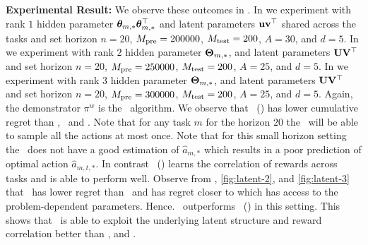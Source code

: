 \textbf{Experimental Result:} We observe these outcomes in . In  we experiment with rank $1$ hidden parameter $\boldsymbol{\theta}_{m,*}\boldsymbol{\theta}_{m,*}^\top$ and latent parameters $\mathbf{u}\mathbf{v}^\top$ shared across the tasks and set horizon $n=20$, $M_{\text{pre}} =  200000$, $M_{\text{test}} = 200$, $A=30$, and $d=5$. 
%
In  we experiment with rank $2$ hidden parameter $\mathbf{\Theta}_{m,*}$, and latent parameters $\mathbf{U}\mathbf{V}^\top$ and set horizon $n=20$, $M_{\text{pre}} =  250000$, $M_{\text{test}} = 200$, $A=25$, and $d=5$. 
%
In  we experiment with rank $3$ hidden parameter $\mathbf{\Theta}_{m,*}$, and latent parameters $\mathbf{U}\mathbf{V}^\top$ and set horizon $n=20$, $M_{\text{pre}} =  300000$, $M_{\text{test}} = 200$, $A=25$, and $d=5$. 
%
Again, the demonstrator $\pi^w$ is the \ts\ algorithm. We observe that \pred\ (\gt) has lower cumulative regret than \dptg, \ad\ and \ts. Note that for any task $m$ for the horizon $20$ the \ts\ will be able to sample all the actions at most once.
%
%
Note that for this small horizon setting the \dptg\ does not have a good estimation of $\widehat{a}_{m,*}$ which results in a poor prediction of optimal action $\widehat{a}_{m,t,*}$. In contrast \pred\ (\gt) learns the correlation of rewards across tasks and is able to perform well.
Observe from , \ref{fig:latent-2}, and \ref{fig:latent-3} that \pred\ has lower regret than \ts\ and has regret closer to \estro which has access to the problem-dependent parameters.
%
Hence. \estro\ outperforms \pred\ (\gt) in this setting.
%
%
This shows that \pred\ is able to exploit the underlying latent structure and reward correlation better than \dptg, and \ad.
